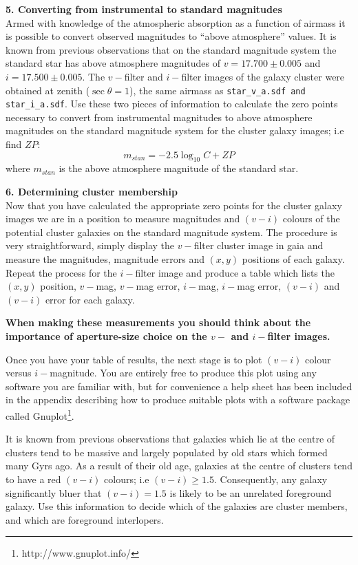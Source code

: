 {\large{\bf 5. Converting from instrumental to standard magnitudes}}\\
Armed with knowledge of the atmospheric absorption as a function of
airmass it is possible to convert observed magnitudes to ``above
atmosphere'' values. It is known from previous observations that on the
standard magnitude system the standard star has above atmosphere
magnitudes of $v=17.700 \pm 0.005$ and $i=17.500\pm 0.005$. The $v-$filter
and $i-$filter images of the galaxy cluster were obtained at zenith 
($\sec \theta=1$), the same airmass as \verb,star_v_a.sdf and star_i_a.sdf,.
Use these two pieces of information to calculate the zero points
necessary to convert from instrumental magnitudes to above atmosphere
magnitudes on the standard magnitude system for the cluster galaxy
images; i.e find $ZP$:
\[
m_{stan} = -2.5\log_{10} C  + ZP 
\]
where $m_{stan}$ is the above atmosphere magnitude of the standard star.

{\large{\bf 6. Determining cluster membership}}\\
Now that you have calculated the appropriate zero points for the
cluster galaxy images we are in a position to measure magnitudes and
$(v-i)$ colours of the potential cluster galaxies on the standard
magnitude system. The procedure is very straightforward, simply
display the $v-$filter cluster image in {\sc gaia} and measure the
magnitudes, magnitude errors and $(x,y)$ positions of each
galaxy. Repeat the process for the $i-$filter image and produce a
table which lists the $(x,y)$ position, $v-$mag, $v-$mag error,
$i-$mag, $i-$mag error, $(v-i)$ and $(v-i)$ error for each
galaxy. 

{\bf When making these measurements you should think about the
importance of aperture-size choice on the $v-$ and $i-$filter images.}

Once you have your table of results, the next stage is to plot 
$(v-i)$ colour versus $i-$magnitude. You are entirely free to
produce this plot using any software you are familiar with, but 
for convenience a help sheet has been included in the appendix 
describing how to produce suitable plots with a software package
called Gnuplot\footnote{http://www.gnuplot.info/}.

It is known from previous observations that galaxies which lie at 
the centre of clusters tend to be massive and largely populated by old stars
which formed many Gyrs ago. As a result of their old age, galaxies at
the centre of clusters tend to have a red $(v-i)$ colours; i.e
$(v-i)\geq1.5$. Consequently, any galaxy significantly bluer that
$(v-i)=1.5$ is likely to be an unrelated foreground galaxy.
Use this information to decide which of the galaxies are cluster 
members, and which are foreground interlopers.

